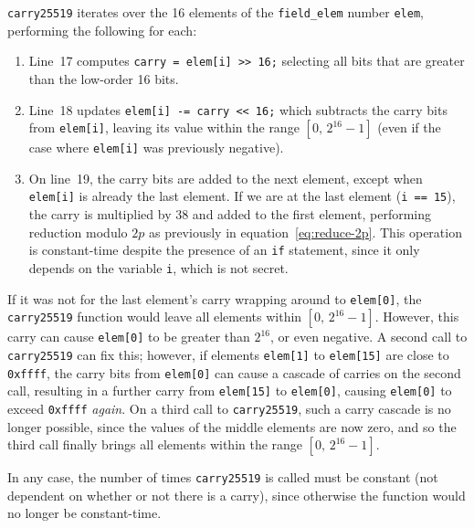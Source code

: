 \documentclass[manuscript]{acmart}
\begin{document}

\verb|carry25519| iterates over the 16 elements of the \verb|field_elem| number \verb|elem|, performing the following for each:
\begin{enumerate}
\item Line~17 computes \verb|carry = elem[i] >> 16;| selecting all bits that are greater than the low-order 16 bits.

\item Line~18 updates \verb|elem[i] -= carry << 16;| which subtracts the carry bits from \verb|elem[i]|, leaving its value within the range $[0,\, 2^{16}-1]$ (even if the case where \verb|elem[i]| was previously negative).

\item On line~19, the carry bits are added to the next element, except when \verb|elem[i]| is already the last element.
    If we are at the last element (\verb|i == 15|), the carry is multiplied by 38 and added to the first element, performing reduction modulo $2p$ as previously in equation~\eqref{eq:reduce-2p}.
    This operation is constant-time despite the presence of an \verb|if| statement, since it only depends on the variable \verb|i|, which is not secret.
\end{enumerate}

If it was not for the last element's carry wrapping around to \verb|elem[0]|, the \verb|carry25519| function would leave all elements within $[0,\, 2^{16}-1]$.
However, this carry can cause \verb|elem[0]| to be greater than $2^{16}$, or even negative.
A second call to \verb|carry25519| can fix this; however, if elements \verb|elem[1]| to \verb|elem[15]| are close to \verb|0xffff|, the carry bits from \verb|elem[0]| can cause a cascade of carries on the second call, resulting in a further carry from \verb|elem[15]| to \verb|elem[0]|, causing \verb|elem[0]| to exceed \verb|0xffff| \emph{again}.
On a third call to \verb|carry25519|, such a carry cascade is no longer possible, since the values of the middle elements are now zero, and so the third call finally brings all elements within the range $[0,\, 2^{16}-1]$.

In any case, the number of times \verb|carry25519| is called must be constant (not dependent on whether or not there is a carry), since otherwise the function would no longer be constant-time.
\end{document}
